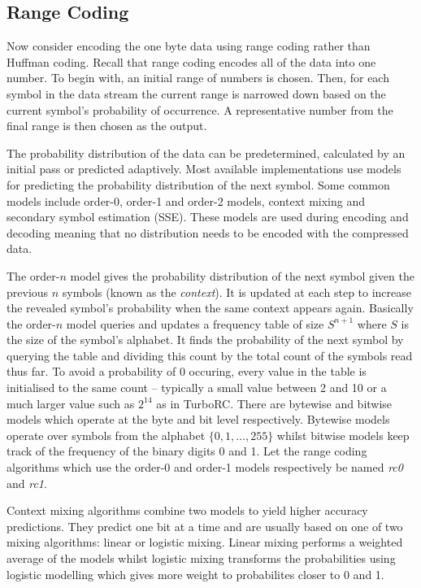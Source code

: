 \subsection{Range Coding}

Now consider encoding the one byte data using range coding rather than Huffman
coding. Recall that range coding encodes all of the data into one number. To
begin with, an initial range of numbers is chosen. Then, for each symbol in the
data stream the current range is narrowed down based on the current symbol's
probability of occurrence. A representative number from the final range is then
chosen as the output.

The probability distribution of the data can be predetermined, calculated by an
initial pass or predicted adaptively. Most available implementations use models
for predicting the probability distribution of the next symbol.
Some common models include order-0, order-1 and order-2 models, context mixing and
secondary symbol estimation (SSE). These models are used during encoding and
decoding meaning that no distribution needs to be encoded with the compressed
data.

The order-$n$ model gives the probability distribution of the next symbol given
the previous $n$ symbols (known as the \textit{context}). It is updated at each
step to increase the revealed symbol's probability when the same context appears
again.
Basically the order-$n$ model queries and updates a frequency table of
size $S^{n+1}$ where $S$ is the size of the symbol's alphabet.
It finds the probability of the next symbol by querying the table and
dividing this count by the total count of the symbols read thus far. To avoid a
probability of 0 occuring, every value in the table is initialised to the
same count -- typically a small value between 2 and 10 or a much larger
value such as $2^{14}$ as in TurboRC.
There are bytewise and bitwise models which operate at the byte and bit level
respectively. Bytewise models operate over symbols from the alphabet
$\{0,1,\dots,255\}$ whilst bitwise models keep track of the frequency of
the binary digits 0 and 1. Let the range coding algorithms which use the order-0
and order-1 models respectively be named \textit{rc0} and \textit{rc1}.

Context mixing algorithms combine two models to yield higher accuracy
predictions. They predict one bit at a time and are usually based on one of
two mixing algorithms: linear or logistic mixing. Linear mixing performs
a weighted average of the models whilst logistic mixing transforms the
probabilities using logistic modelling which gives more weight to
probabilites closer to 0 and 1.


